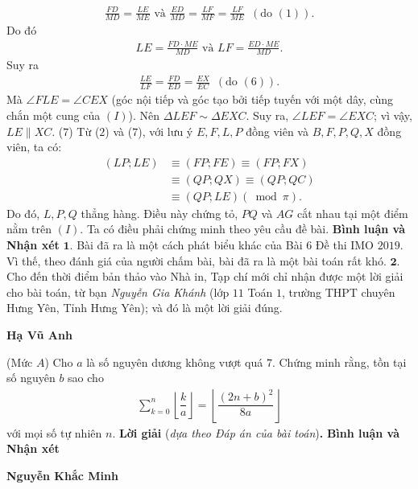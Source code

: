 \begin{multicols}{2}
	\begin{align*}
		\frac{{FD}}{{MD}} \!=\! \frac{{LE}}{{ME}} \text{ và } \frac{{ED}}{{MD}} \!=\! \frac{{LF}}{{MF}} \!=\! \frac{{LF}}{{ME}}\,\,\,({\text{do }}(1)).
	\end{align*} 
	Do đó
	\begin{align*}
		LE = \frac{{FD \cdot ME}}{{MD}} \text{ và } LF = \frac{{ED \cdot ME}}{{MD}}.
	\end{align*}
	Suy ra
	\begin{align*}
		\frac{{LE}}{{LF}} = \frac{{FD}}{{ED}} = \frac{{EX}}{{EC}}\,\,\,({\text{do }}(6)).
	\end{align*}
	Mà $\angle FLE = \angle CEX$ (góc nội tiếp và góc tạo bởi tiếp tuyến với một dây, cùng chắn một cung của $(I)$).
	\vskip 0.1cm
	Nên $\Delta LEF \sim \Delta EXC$. Suy ra, $\angle LEF = \angle EXC$; vì vậy, $LE \parallel XC$. \hfill ($7$)
	\vskip 0.05cm
	Từ ($2$) và ($7$), với lưu ý $E, F, L, P$ đồng viên và $B, F, P, Q, X$ đồng viên, ta có:
	\begin{align*}
		\left( {LP;LE} \right) &\equiv \left( {FP;FE} \right) \equiv \left( {FP;FX} \right) \\
		&\equiv \left( {QP;QX} \right) \equiv \left( {QP;QC} \right) \\
		&\equiv \left( {QP;LE} \right)\left( {\bmod \pi } \right).
	\end{align*}
	Do đó, $L, P, Q$ thẳng hàng. Điều này chứng tỏ, $PQ$ và $AG$ cắt nhau tại một điểm nằm trên $(I)$.
	\vskip 0.05cm
	Ta có điều phải chứng minh theo yêu cầu đề bài.
	\vskip 0.05cm
	\textbf{\color{thachthuctoanhoc}Bình luận và Nhận xét}
	\vskip 0.05cm
	$\pmb{1.}$ Bài đã ra là một cách phát biểu khác của Bài $6$ Đề thi IMO $2019$. Vì thế, theo đánh giá của người chấm bài, bài đã ra là một bài toán rất khó.
	\vskip 0.05cm
	$\pmb{2.}$ Cho đến thời điểm bản thảo vào Nhà in, Tạp chí mới chỉ nhận được một lời giải cho bài toán, từ bạn \textit{Nguyễn Gia Khánh} (lớp $11$ Toán $1$, trường THPT chuyên Hưng Yên, Tỉnh Hưng Yên); và đó là một lời giải đúng.
	\begin{flushright}
		\textbf{\color{thachthuctoanhoc}Hạ Vũ Anh}
	\end{flushright}
	{\color{thachthuctoanhoc}{\usefont{T5}{qag}{b}{n} P710.}}
	(Mức $A$) Cho $a$ là số nguyên dương không vượt quá $7$. Chứng minh rằng, tồn tại số nguyên $b$ sao cho
	\begin{align*}
		\sum\limits_{k=0}^n\left\lfloor\dfrac ka\right\rfloor=\left\lfloor\dfrac {(2n+b)^2}{8a}\right\rfloor
	\end{align*}
	với mọi số tự nhiên $n$.
	\vskip 0.05cm
	\textbf{\color{thachthuctoanhoc}Lời giải} (\textit{dựa theo Đáp án của bài toán})\textbf{\color{thachthuctoanhoc}.}
	\vskip 0.05cm
	\textbf{\color{thachthuctoanhoc}Bình luận và Nhận xét}
	
	\begin{flushright}
		\textbf{\color{thachthuctoanhoc}Nguyễn Khắc Minh}
	\end{flushright}
\end{multicols}	
